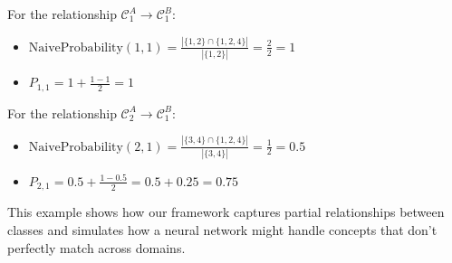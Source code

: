 For the relationship $\mathcal{C}_1^A \rightarrow \mathcal{C}_1^B$:
\begin{itemize}
    \item $\text{NaiveProbability}(1,1) = \frac{|\{1,2\} \cap \{1,2,4\}|}{|\{1,2\}|} = \frac{2}{2} = 1$
    \item $P_{1,1} = 1 + \frac{1-1}{2} = 1$
\end{itemize}

For the relationship $\mathcal{C}_2^A \rightarrow \mathcal{C}_1^B$:
\begin{itemize}
    \item $\text{NaiveProbability}(2,1) = \frac{|\{3,4\} \cap \{1,2,4\}|}{|\{3,4\}|} = \frac{1}{2} = 0.5$
    \item $P_{2,1} = 0.5 + \frac{1-0.5}{2} = 0.5 + 0.25 = 0.75$
\end{itemize}

This example shows how our framework captures partial relationships between classes and simulates how a neural network might handle concepts that don't perfectly match across domains.
